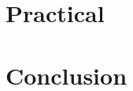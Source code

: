 \documentclass{mimosis}
\begin{document}
\part[Practical]{%
	Practical\\
}\label{part:practical}



\part[Conclusion]{%
	Conclusion\\
}\label{part:conclusion}


\backmatter

\begingroup
\let\clearpage\relax
\glsaddall
\printglossary[type=\acronymtype]
\newpage
\endgroup

\printindex
\printbibliography
\end{document}

